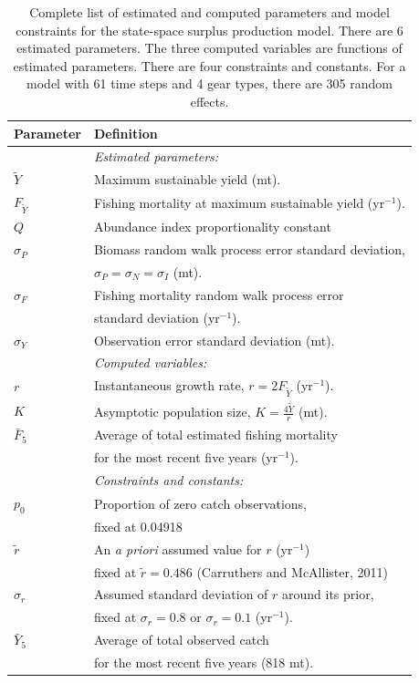 \documentclass[12pt,letterpaper]{article}
\newcommand\peryr{yr$^{-1}$}
\newcommand\MSY{\widetilde{Y}}
\newcommand\Fmsy{F_{\MSY}}
\begin{document}
\begin{table}
\caption{Complete list of estimated and computed parameters and model
constraints for the state-space surplus production model. 
There are 6 estimated parameters. 
The three computed variables are functions of estimated parameters.
There are four constraints and constants.
For a model with 61 time steps and 4 gear types, there are 305 random effects.
}
\label{tab:allvars1}
\begin{center}
\begin{tabular}{ll}
\hline
Parameter & Definition\\
\hline
\hline
       & {\it Estimated parameters:}\\
$\MSY$ & Maximum sustainable yield (mt).\\
$\Fmsy$& Fishing mortality at maximum sustainable yield (\peryr).\\
$Q$    & Abundance index proportionality constant\\
$\sigma_P$ & Biomass random walk process error standard deviation,\\
           & $\sigma_P=\sigma_N=\sigma_I$ (mt).\\
$\sigma_F$ & Fishing mortality random walk process error\\
           & standard deviation (\peryr).\\
$\sigma_Y$ & Observation error standard deviation (mt).\\
\hline
       & {\it Computed variables:}\\
$r$    & Instantaneous growth rate, $r=2F_{\MSY}$ (\peryr).\\
$K$    & Asymptotic population size, $K=\frac{4\MSY}{r}$ (mt).\\
$\bar{F}_5$ & Average of total estimated fishing mortality\\
            & for the most recent five years (\peryr).\\
\hline
       & {\it Constraints and constants:}\\
$p_0$  & Proportion of zero catch observations,\\
       & fixed at 0.04918\\
$\tilde{r}$ & An {\it a priori} assumed value for $r$ (\peryr)\\
            & fixed at $\tilde{r}=0.486$ (Carruthers and McAllister, 2011)\\
$\sigma_r$  & Assumed standard deviation of $r$ around its prior,\\
            & fixed at $\sigma_r=0.8$ or $\sigma_r=0.1$ (\peryr).\\
$\bar{Y}_5$ & Average of total observed catch\\
            & for the most recent five years (818 mt).\\
\hline
\end{tabular}
\end{center}
\end{table}
\end{document}
